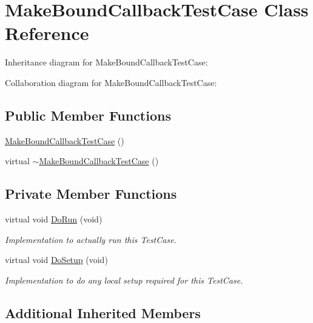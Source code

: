 \hypertarget{classMakeBoundCallbackTestCase}{}\section{Make\+Bound\+Callback\+Test\+Case Class Reference}
\label{classMakeBoundCallbackTestCase}


Inheritance diagram for Make\+Bound\+Callback\+Test\+Case\+:


Collaboration diagram for Make\+Bound\+Callback\+Test\+Case\+:
\subsection*{Public Member Functions}
\begin{DoxyCompactItemize}
\item 
\hyperlink{classMakeBoundCallbackTestCase_a07fc7f8e654d2e3ea6eb302fdf33bf4c}{Make\+Bound\+Callback\+Test\+Case} ()
\item 
virtual \hyperlink{classMakeBoundCallbackTestCase_ab20f4378d6d4162d12c515db2fecc5c1}{$\sim$\+Make\+Bound\+Callback\+Test\+Case} ()
\end{DoxyCompactItemize}
\subsection*{Private Member Functions}
\begin{DoxyCompactItemize}
\item 
virtual void \hyperlink{classMakeBoundCallbackTestCase_a772b25a78de2ba45e41087fc1157c61c}{Do\+Run} (void)
\begin{DoxyCompactList}\small\item\em Implementation to actually run this Test\+Case. \end{DoxyCompactList}\item 
virtual void \hyperlink{classMakeBoundCallbackTestCase_a42a4ec7831e20fd7b497defec1e51f16}{Do\+Setup} (void)
\begin{DoxyCompactList}\small\item\em Implementation to do any local setup required for this Test\+Case. \end{DoxyCompactList}\end{DoxyCompactItemize}
\subsection*{Additional Inherited Members}


